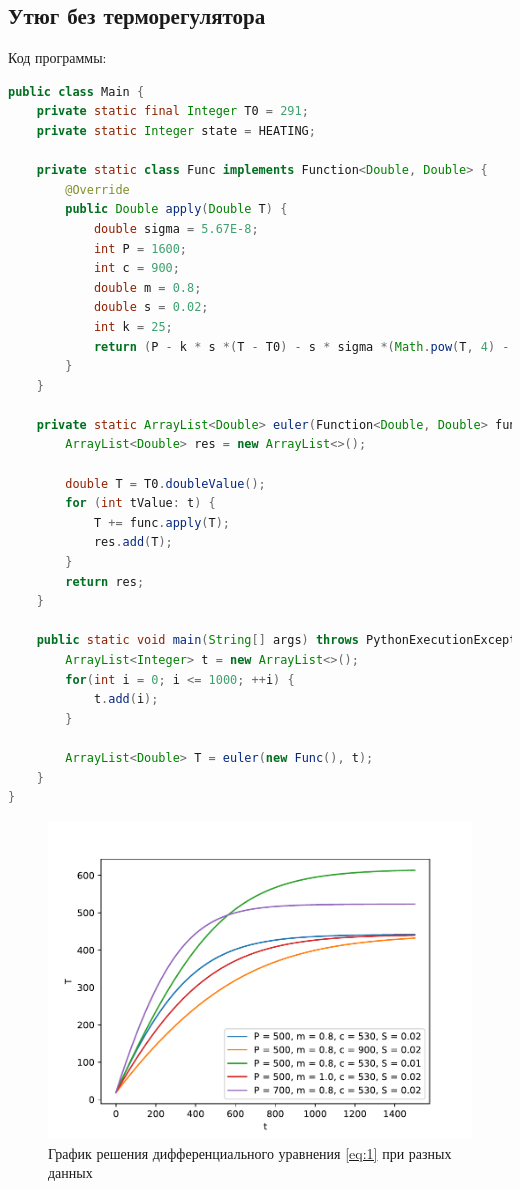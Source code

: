 \documentclass[a4paper, 14pt]{extarticle}
\begin{document}
		\subsection{Утюг без терморегулятора}
			Код программы:
			\begin{lstlisting}[language=Java]
public class Main {
	private static final Integer T0 = 291;
	private static Integer state = HEATING;
	
	private static class Func implements Function<Double, Double> {
		@Override
		public Double apply(Double T) {
			double sigma = 5.67E-8;
			int P = 1600;
			int c = 900;
			double m = 0.8;
			double s = 0.02;
			int k = 25;
			return (P - k * s *(T - T0) - s * sigma *(Math.pow(T, 4) - Math.pow(T0, 4))) / c * m;
		}
	}
	
	private static ArrayList<Double> euler(Function<Double, Double> func, ArrayList<Integer> t) {
		ArrayList<Double> res = new ArrayList<>();
		
		double T = T0.doubleValue();
		for (int tValue: t) {
			T += func.apply(T);
			res.add(T);
		}
		return res;
	}
	
	public static void main(String[] args) throws PythonExecutionException, IOException {
		ArrayList<Integer> t = new ArrayList<>();
		for(int i = 0; i <= 1000; ++i) {
			t.add(i);
		}
		
		ArrayList<Double> T = euler(new Func(), t);
	}
}
			\end{lstlisting}
			\begin{figure}[H]
				\centering
				\includegraphics[width = .75\linewidth]{fig1.pdf}
				\caption[.] {График решения дифференциального уравнения \eqref{eq:1} при разных данных}
			\end{figure}
		\pagebreak
\end{document}
